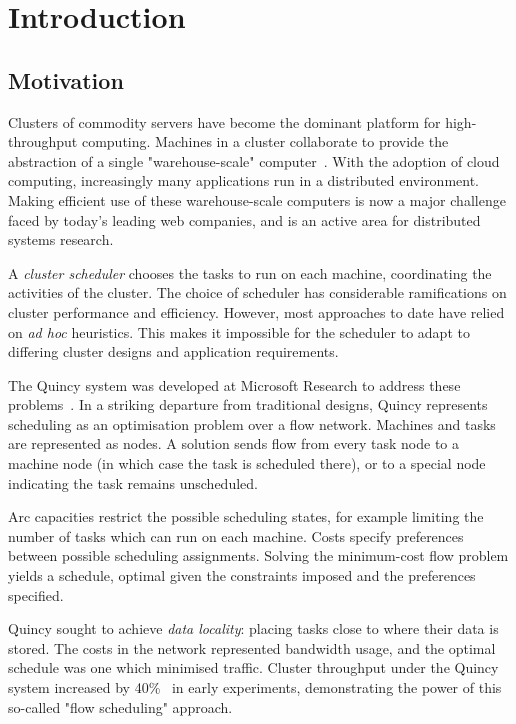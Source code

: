 \chapter{Introduction} \label{chap:intro}



\section{Motivation} \label{sec:intro-motivation}
Clusters of commodity servers have become the dominant platform for high-throughput computing. Machines in a cluster collaborate to provide the abstraction of a single "warehouse-scale" computer~\cite{WarehouseScale:2009}. With the adoption of cloud computing, increasingly many applications run in a distributed environment. Making efficient use of these warehouse-scale computers is now a major challenge faced by today's leading web companies, and is an active area for distributed systems research.

A \emph{cluster scheduler} chooses the tasks to run on each machine, coordinating the activities of the cluster. The choice of scheduler has considerable ramifications on cluster performance and efficiency. However, most approaches to date have relied on \emph{ad hoc} heuristics. This makes it impossible for the scheduler to adapt to differing cluster designs and application requirements.

The Quincy system was developed at Microsoft Research to address these problems~\cite{Isard:2009}. In a striking departure from traditional designs, Quincy represents scheduling as an optimisation problem over a flow network. Machines and tasks  are represented as nodes. A solution sends flow from every task node to a machine node (in which case the task is scheduled there), or to a special node indicating the task remains unscheduled.

Arc capacities restrict the possible scheduling states, for example limiting the number of tasks which can run on each machine. Costs specify preferences between possible scheduling assignments. Solving the minimum-cost flow problem yields a schedule, optimal given the constraints imposed and the preferences specified.

Quincy sought to achieve \emph{data locality}: placing tasks close to where their data is stored. The costs in the network represented bandwidth usage, and the optimal schedule was one which minimised traffic. Cluster throughput under the Quincy system increased by 40\%~\cite{Isard:2009} in early experiments, demonstrating the power of this so-called "flow scheduling" approach.


